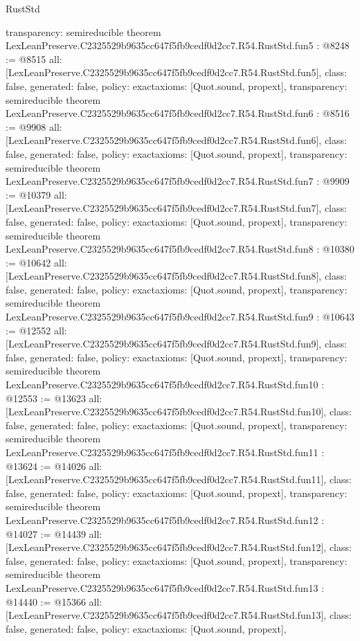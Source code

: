 \begin{lexlean}{RustStd}
\begin{coremodule}
{  transparency: semireducible
}
theorem LexLeanPreserve.C2325529b9635cc647f5fb9cedf0d2cc7.R54.RustStd.fun5 : @8248 := @8515 {
  all: [LexLeanPreserve.C2325529b9635cc647f5fb9cedf0d2cc7.R54.RustStd.fun5],
  class: false,
  generated: false,
  policy: exact{axioms: [Quot.sound, propext]},
  transparency: semireducible
}
theorem LexLeanPreserve.C2325529b9635cc647f5fb9cedf0d2cc7.R54.RustStd.fun6 : @8516 := @9908 {
  all: [LexLeanPreserve.C2325529b9635cc647f5fb9cedf0d2cc7.R54.RustStd.fun6],
  class: false,
  generated: false,
  policy: exact{axioms: [Quot.sound, propext]},
  transparency: semireducible
}
theorem LexLeanPreserve.C2325529b9635cc647f5fb9cedf0d2cc7.R54.RustStd.fun7 : @9909 := @10379 {
  all: [LexLeanPreserve.C2325529b9635cc647f5fb9cedf0d2cc7.R54.RustStd.fun7],
  class: false,
  generated: false,
  policy: exact{axioms: [Quot.sound, propext]},
  transparency: semireducible
}
theorem LexLeanPreserve.C2325529b9635cc647f5fb9cedf0d2cc7.R54.RustStd.fun8 : @10380 := @10642 {
  all: [LexLeanPreserve.C2325529b9635cc647f5fb9cedf0d2cc7.R54.RustStd.fun8],
  class: false,
  generated: false,
  policy: exact{axioms: [Quot.sound, propext]},
  transparency: semireducible
}
theorem LexLeanPreserve.C2325529b9635cc647f5fb9cedf0d2cc7.R54.RustStd.fun9 : @10643 := @12552 {
  all: [LexLeanPreserve.C2325529b9635cc647f5fb9cedf0d2cc7.R54.RustStd.fun9],
  class: false,
  generated: false,
  policy: exact{axioms: [Quot.sound, propext]},
  transparency: semireducible
}
theorem LexLeanPreserve.C2325529b9635cc647f5fb9cedf0d2cc7.R54.RustStd.fun10 : @12553 := @13623 {
  all: [LexLeanPreserve.C2325529b9635cc647f5fb9cedf0d2cc7.R54.RustStd.fun10],
  class: false,
  generated: false,
  policy: exact{axioms: [Quot.sound, propext]},
  transparency: semireducible
}
theorem LexLeanPreserve.C2325529b9635cc647f5fb9cedf0d2cc7.R54.RustStd.fun11 : @13624 := @14026 {
  all: [LexLeanPreserve.C2325529b9635cc647f5fb9cedf0d2cc7.R54.RustStd.fun11],
  class: false,
  generated: false,
  policy: exact{axioms: [Quot.sound, propext]},
  transparency: semireducible
}
theorem LexLeanPreserve.C2325529b9635cc647f5fb9cedf0d2cc7.R54.RustStd.fun12 : @14027 := @14439 {
  all: [LexLeanPreserve.C2325529b9635cc647f5fb9cedf0d2cc7.R54.RustStd.fun12],
  class: false,
  generated: false,
  policy: exact{axioms: [Quot.sound, propext]},
  transparency: semireducible
}
theorem LexLeanPreserve.C2325529b9635cc647f5fb9cedf0d2cc7.R54.RustStd.fun13 : @14440 := @15366 {
  all: [LexLeanPreserve.C2325529b9635cc647f5fb9cedf0d2cc7.R54.RustStd.fun13],
  class: false,
  generated: false,
  policy: exact{axioms: [Quot.sound, propext]},
}
\end{coremodule}
\end{lexlean}
